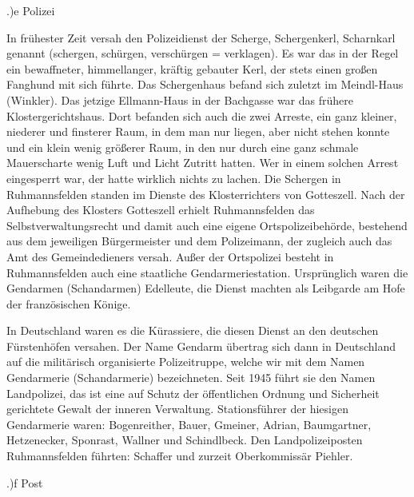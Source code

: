 .)e Polizei

In frühester Zeit versah den Polizeidienst der Scherge, Schergenkerl, Scharnkarl
genannt (schergen, schürgen, verschürgen = verklagen). Es war das in der Regel
ein bewaffneter, himmellanger, kräftig gebauter Kerl, der stets einen großen
Fanghund mit sich führte. Das Schergenhaus befand sich zuletzt im Meindl-Haus
(Winkler). Das jetzige Ellmann-Haus in der Bachgasse war das frühere
Klostergerichtshaus. Dort befanden sich auch die zwei Arreste, ein ganz kleiner,
niederer und finsterer Raum, in dem man nur liegen, aber nicht stehen konnte und
ein klein wenig größerer Raum, in den nur durch eine ganz schmale Mauerscharte
wenig Luft und Licht Zutritt hatten. Wer in einem solchen Arrest eingesperrt
war, der hatte wirklich nichts zu lachen. Die Schergen in Ruhmannsfelden standen
im Dienste des Klosterrichters von Gotteszell. Nach der Aufhebung des Klosters
Gotteszell erhielt Ruhmannsfelden das Selbstverwaltungsrecht und damit auch eine
eigene Ortspolizeibehörde, bestehend aus dem jeweiligen Bürgermeister und dem
Polizeimann, der zugleich auch das Amt des Gemeindedieners versah. Außer der
Ortspolizei besteht in Ruhmannsfelden auch eine staatliche Gendarmeriestation.
Ursprünglich waren die Gendarmen (Schandarmen) Edelleute, die Dienst machten als
Leibgarde am Hofe der französischen Könige.

In Deutschland waren es die Kürassiere, die diesen Dienst an den deutschen
Fürstenhöfen versahen. Der Name Gendarm übertrag sich dann in Deutschland auf
die militärisch organisierte Polizeitruppe, welche wir mit dem Namen Gendarmerie
(Schandarmerie) bezeichneten. Seit 1945 führt sie den Namen Landpolizei, das ist
eine auf Schutz der öffentlichen Ordnung und Sicherheit gerichtete Gewalt der
inneren Verwaltung. Stationsführer der hiesigen Gendarmerie waren: Bogenreither,
Bauer, Gmeiner, Adrian, Baumgartner, Hetzenecker, Sponrast, Wallner und
Schindlbeck. Den Landpolizeiposten Ruhmannsfelden führten: Schaffer und zurzeit
Oberkommissär Piehler.

.)f Post

